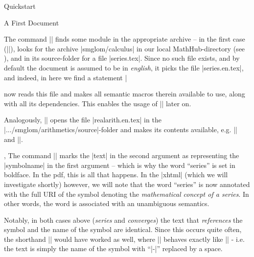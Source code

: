 \begin{sfragment}{Quickstart}
\begin{sfragment}{A First \sTeX Document}
    \begin{function}{\usemodule}
      The command ||
      finds some module in the appropriate archive -- in the first
      case (||), \sTeX
      looks for the archive |smglom/calculus| in our local
      MathHub-directory (see ), and
      in its source-folder for a file |series.tex|. Since no such
      file exists, and by default the document is assumed to be
      in \emph{english}, it picks the file |series.en.tex|, and
      indeed, in here we find a statement |\fi
      
      \sTeX now reads this file and makes all semantic macros therein
      available to use, along with all its dependencies.
      This enables the usage of |\infinitesum| later on.

      Analogously, ||
      opens the file |realarith.en.tex| in the |.../smglom/arithmetics/source|-folder
      and makes its contents available, e.g. |\realdivide| and |\realpower|.
    \end{function}

    \begin{function}{\symref,\symname}
      The command || marks the |text|
      in the second argument as representing the |symbolname|
      in the first argument -- which is why the word ``series''
      is set in boldface. In the pdf, this is all that happens.
      In the |xhtml| (which we will investigate shortly) however,
      we will note that the word ``series'' is now annotated with the
      full URI of the symbol denoting the \emph{mathematical concept of
      a series}. In other words, the word is associated with an unambiguous
      semantics.

      Notably, in both cases above (\emph{series} and \emph{converges})
      the text that \emph{references} the symbol and the name of the symbol
      are identical. Since this occurs quite often, the shorthand
      || would have worked as well, where
      || behaves exactly like ||
      - i.e. the text is simply the name of the symbol with ``|-|'' replaced by
      a space.
    \end{function}


\end{sfragment}
\end{sfragment}
